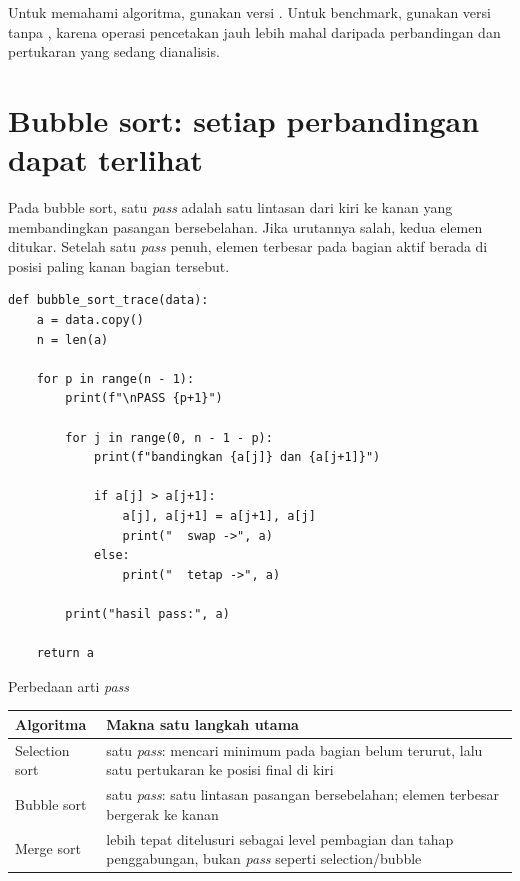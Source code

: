 \documentclass[11pt,a4paper]{report}
\newcommand{\kode}[1]{\texttt{\detokenize{#1}}}
\begin{document}
\begin{catatanbox}
Untuk memahami algoritma, gunakan versi \kode{*_trace}. Untuk benchmark, gunakan versi tanpa \kode{print}, karena operasi pencetakan jauh lebih mahal daripada perbandingan dan pertukaran yang sedang dianalisis.
\end{catatanbox}

\section{Bubble sort: setiap perbandingan dapat terlihat}
Pada bubble sort, satu \textit{pass} adalah satu lintasan dari kiri ke kanan yang membandingkan pasangan bersebelahan. Jika urutannya salah, kedua elemen ditukar. Setelah satu \textit{pass} penuh, elemen terbesar pada bagian aktif berada di posisi paling kanan bagian tersebut.

\begin{lstlisting}
def bubble_sort_trace(data):
    a = data.copy()
    n = len(a)

    for p in range(n - 1):
        print(f"\nPASS {p+1}")

        for j in range(0, n - 1 - p):
            print(f"bandingkan {a[j]} dan {a[j+1]}")

            if a[j] > a[j+1]:
                a[j], a[j+1] = a[j+1], a[j]
                print("  swap ->", a)
            else:
                print("  tetap ->", a)

        print("hasil pass:", a)

    return a
\end{lstlisting}

\begin{idebox}{Perbedaan arti \textit{pass}}
\begin{tabularx}{\textwidth}{@{}p{}X@{}}
\toprule
\textbf{Algoritma} & \textbf{Makna satu langkah utama} \\
\midrule
Selection sort & satu \textit{pass}: mencari minimum pada bagian belum terurut, lalu satu pertukaran ke posisi final di kiri \\
Bubble sort & satu \textit{pass}: satu lintasan pasangan bersebelahan; elemen terbesar bergerak ke kanan \\
Merge sort & lebih tepat ditelusuri sebagai level pembagian dan tahap penggabungan, bukan \textit{pass} seperti selection/bubble \\
\bottomrule
\end{tabularx}
\end{idebox}
\end{document}
